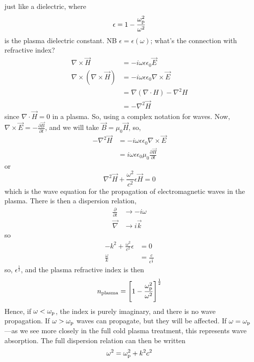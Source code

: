 \documentclass{book}         		                %
\begin{document}
just like a dielectric, where 
\begin{equation}
  \label{eq:epsilon}
  \epsilon = 1 - \frac{\omega^2_{\rm p}}{\omega^2}
\end{equation}
is the plasma dielectric constant.
NB $\epsilon = \epsilon(\omega)$; what's the connection with refractive index?
\begin{align*}
  \nabla \times \vec{H} &= -i \omega \epsilon \epsilon_0 \vec{E} \\
\nabla \times (\nabla \times \vec{H}) &= -i \omega \epsilon \epsilon_0 \nabla \times \vec{E} \\ &= \nabla(\nabla \cdot H) - \nabla^2 H \\ &= - \nabla^2 \vec{H}
\end{align*}
since $\nabla \cdot \vec{H} = 0$ in a plasma.
So, using a complex notation for waves. Now, $\nabla \times \vec{E} = - \frac{\partial \vec{B}}{\partial t}$, and we will take $\vec{B}= \mu_0 \vec{H}$, so,
\begin{align*}
  - \nabla^2 \vec{H} &= -i \omega \epsilon \epsilon_0 \nabla \times \vec{E} \\ &= i \omega \epsilon \epsilon_0 \mu_0 \frac{\partial \vec{H}}{\partial t}
\end{align*}
or 
\begin{equation}
  \label{eq:waveeqpropeminplasma}
  \nabla^2 \vec{H} + \frac{\omega^2}{c^2} \epsilon \vec{H} = 0
\end{equation}
which is the wave equation  for the propagation of electromagnetic waves in the plasma.
There is then a dispersion relation,
\begin{align*}
  \frac{\partial}{\partial t} & \to -i \omega \\
\vec{\nabla} & \to i \vec{k}
\end{align*}
so
\begin{align*}
  -k^2 + \frac{\omega^2}{c^2}\epsilon &= 0 \\
\frac{\omega}{k} &= \frac{c}{\epsilon^{\frac{1}{2}}}
\end{align*}
so, $\epsilon^{\frac{1}{2}}$, and the plasma refractive index is then
\begin{equation}
  \label{eq:plasmarefind}
  n_{\rm plasma} = \left[ 1 - \frac{\omega_{\rm p}^2}{\omega^2}\right]^{\frac{1}{2}}
\end{equation}
Hence, if $\omega < \omega_{\rm p}$, the index is purely imaginary,
and there is no wave propagation. If $\omega > \omega_{\rm p}$ waves
can propagate, but they will be affected. If $\omega = \omega_{\rm
  p}$---as we see more closely in the full cold plasma treatment, this
represents wave absorption. The full dispersion relation can then be
written
\begin{equation}
  \label{eq:plasmadispersion}
  \omega^2 = \omega_{\rm p}^2 + k^2c^2
\end{equation}
\end{document}
